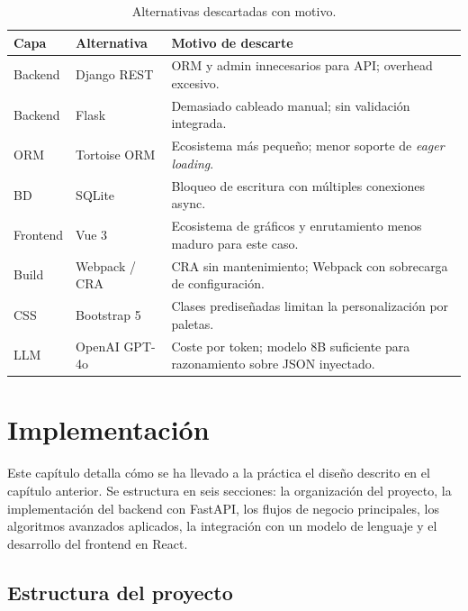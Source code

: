 \documentclass[12pt,twoside,titlepage]{report}
\begin{document}
\begin{table}[H]
  \centering
  \caption{Alternativas descartadas con motivo.}
  \label{tab:alternativas_tech}
  \begin{tabularx}{\textwidth}{llX}
    \toprule
    \textbf{Capa} & \textbf{Alternativa} & \textbf{Motivo de descarte} \\
    \midrule
    Backend   & Django REST       & ORM y admin innecesarios para API; overhead excesivo. \\
    Backend   & Flask             & Demasiado cableado manual; sin validación integrada. \\
    ORM       & Tortoise ORM      & Ecosistema más pequeño; menor soporte de \emph{eager loading}. \\
    BD        & SQLite            & Bloqueo de escritura con múltiples conexiones async. \\
    Frontend  & Vue 3             & Ecosistema de gráficos y enrutamiento menos maduro para este caso. \\
    Build     & Webpack / CRA     & CRA sin mantenimiento; Webpack con sobrecarga de configuración. \\
    CSS       & Bootstrap 5       & Clases prediseñadas limitan la personalización por paletas. \\
    LLM       & OpenAI GPT-4o     & Coste por token; modelo 8B suficiente para razonamiento sobre JSON inyectado. \\
    \bottomrule
  \end{tabularx}
\end{table}


%
%
\chapter{Implementación}

Este capítulo detalla cómo se ha llevado a la práctica el diseño descrito en el capítulo anterior. Se estructura en seis secciones: la organización del proyecto, la implementación del backend con FastAPI, los flujos de negocio principales, los algoritmos avanzados aplicados, la integración con un modelo de lenguaje y el desarrollo del frontend en React.

\section{Estructura del proyecto}
\end{document}
